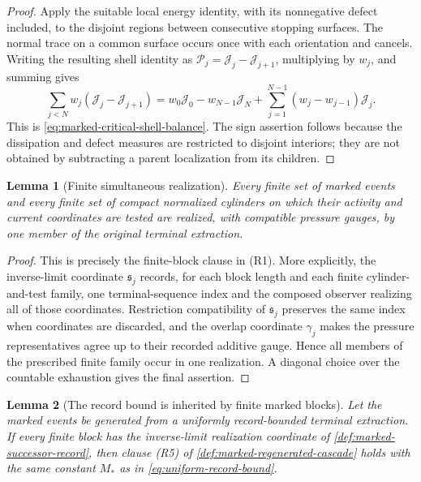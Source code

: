 \documentclass[11pt]{amsart}
\numberwithin{equation}{section}
\theoremstyle{plain}
\newtheorem{lemma}[lemma]{Lemma}
\theoremstyle{definition}
\theoremstyle{remark}
\begin{document}
\begin{proof}
Apply the suitable local energy identity, with its nonnegative defect included,
to the disjoint regions between consecutive stopping surfaces.  The normal
trace on a common surface occurs once with each orientation and cancels.
Writing the resulting shell identity as
\(\mathscr P_j=\mathscr J_j-\mathscr J_{j+1}\), multiplying by \(w_j\), and
summing gives
\[
 \sum_{j<N}w_j(\mathscr J_j-\mathscr J_{j+1})
 =w_0\mathscr J_0-w_{N-1}\mathscr J_N
  +\sum_{j=1}^{N-1}(w_j-w_{j-1})\mathscr J_j.
\]
This is \eqref{eq:marked-critical-shell-balance}.  The sign assertion follows
because the dissipation and defect measures are restricted to disjoint
interiors; they are not obtained by subtracting a parent localization from its
children.
\end{proof}

\begin{lemma}[Finite simultaneous realization]
\label{lem:marked-finite-simultaneous-realization}
Every finite set of marked events and every finite set of compact normalized
cylinders on which their activity and current coordinates are tested are
realized, with compatible pressure gauges, by one member of the original
terminal extraction.
\end{lemma}

\begin{proof}
This is precisely the finite-block clause in \textup{(R1)}.  More explicitly,
the inverse-limit coordinate \(\mathfrak s_j\) records, for each block length
and each finite cylinder-and-test family, one terminal-sequence index and the
composed observer realizing all of those coordinates.  Restriction
compatibility of \(\mathfrak s_j\) preserves the same index when coordinates
are discarded, and the overlap coordinate \(\gamma_j\) makes the pressure
representatives agree up to their recorded additive gauge.  Hence all members
of the prescribed finite family occur in one realization.  A diagonal choice
over the countable exhaustion gives the final assertion.
\end{proof}

\begin{lemma}[The record bound is inherited by finite marked blocks]
\label{lem:record-bound-inherited-by-marked-blocks}
Let the marked events be generated from a uniformly record-bounded terminal
extraction.  If every finite block has the inverse-limit realization
coordinate of \cref{def:marked-successor-record}, then clause \textup{(R5)}
of \cref{def:marked-regenerated-cascade} holds with the same constant \(M_*\)
as in \eqref{eq:uniform-record-bound}.
\end{lemma}
\end{document}
